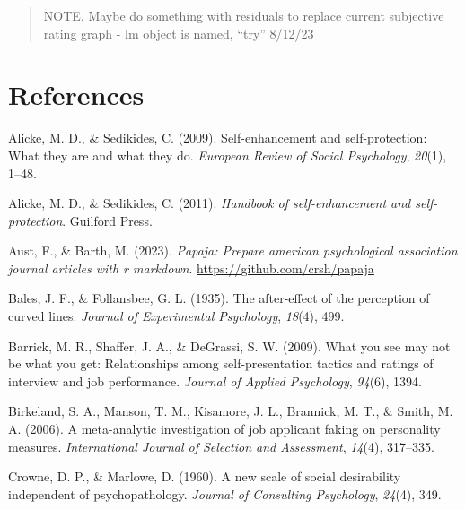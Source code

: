 \documentclass[
  ,jou]{apa6}
\newlength{\cslhangindent}
\newenvironment{CSLReferences}[2] %
 {\begin{list}{}{%
  \setlength{\itemindent}{0pt}
  \setlength{\leftmargin}{0pt}
  \setlength{\parsep}{0pt}
  \ifodd #1
   \setlength{\leftmargin}{\cslhangindent}
   \setlength{\itemindent}{-1\cslhangindent}
  \fi
  \setlength{\itemsep}{#2\baselineskip}}}
 {\end{list}}
\begin{document}
\begin{quote}
NOTE. Maybe do something with residuals to replace current subjective rating graph - lm object is named, ``try'' 8/12/23
\end{quote}

\section{References}\label{references}

\begingroup
\setlength{\parindent}{-0.5in}
\setlength{\leftskip}{0.5in}

\label{refs}
\begin{CSLReferences}{1}{0}
Alicke, M. D., \& Sedikides, C. (2009). Self-enhancement and self-protection: What they are and what they do. \emph{European Review of Social Psychology}, \emph{20}(1), 1--48.

Alicke, M. D., \& Sedikides, C. (2011). \emph{Handbook of self-enhancement and self-protection}. Guilford Press.

Aust, F., \& Barth, M. (2023). \emph{Papaja: Prepare american psychological association journal articles with r markdown}. \url{https://github.com/crsh/papaja}

Bales, J. F., \& Follansbee, G. L. (1935). The after-effect of the perception of curved lines. \emph{Journal of Experimental Psychology}, \emph{18}(4), 499.

Barrick, M. R., Shaffer, J. A., \& DeGrassi, S. W. (2009). What you see may not be what you get: Relationships among self-presentation tactics and ratings of interview and job performance. \emph{Journal of Applied Psychology}, \emph{94}(6), 1394.

Birkeland, S. A., Manson, T. M., Kisamore, J. L., Brannick, M. T., \& Smith, M. A. (2006). A meta-analytic investigation of job applicant faking on personality measures. \emph{International Journal of Selection and Assessment}, \emph{14}(4), 317--335.

Crowne, D. P., \& Marlowe, D. (1960). A new scale of social desirability independent of psychopathology. \emph{Journal of Consulting Psychology}, \emph{24}(4), 349.


\end{CSLReferences}
\end{document}
